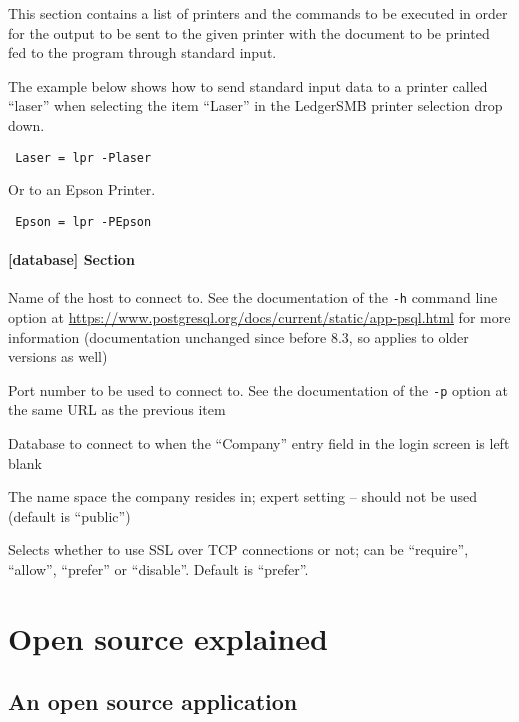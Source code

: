 This section contains a list of printers and the commands
to be executed in order for the output to be sent to the given printer with
the document to be printed fed to the program through standard input.

The example below shows how to send standard input data to a printer called ``laser''
when selecting the item ``Laser'' in the LedgerSMB printer selection drop down.

\texttt{
        Laser    = lpr -Plaser
}

Or to an Epson Printer.

\texttt{
        Epson   = lpr -PEpson
}


\subsubsection{[database] Section}
\label{subsubsec-global-config-ledgersmb-conf-database}

\begin{description}[style=nextline]
        \item [host] Name of the host to connect to. See the documentation of the {\tt -h} command line option at 
        \url{https://www.postgresql.org/docs/current/static/app-psql.html}
        for more information (documentation unchanged since before 8.3, so applies to older versions as well)
        \item [port] Port number to be used to connect to. See the documentation of the {\tt -p} option at the
        same URL as the previous item
        \item [default\_db] Database to connect to when the ``Company'' entry field in the login screen is left blank
        \item [db\_namespace] The name space the company resides in; expert setting -- should not be used (default is
        ``public'')
        \item [sslmode] Selects whether to use \gls{SSL} over TCP connections or not; can be ``require'', ``allow'',
        ``prefer'' or ``disable''.  Default is ``prefer''.
\end{description}

\chapter{Open source explained}
\label{app-open-source-explained}

\section{An open source application}
\label{sec-open-source-application}

